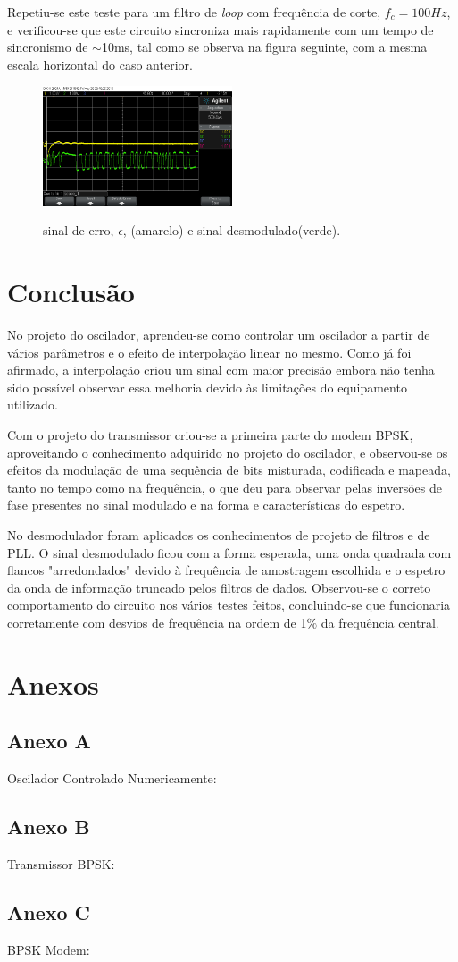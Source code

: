 \documentclass[11pt]{article}
\numberwithin{equation}{section}
\begin{document}
	Repetiu-se este teste para um filtro de \textit{loop} com frequência de corte, $f_c = 100Hz$, e verificou-se que este circuito sincroniza mais rapidamente com um tempo de sincronismo de $\sim$10ms, tal como se observa na figura seguinte, com a mesma escala horizontal do caso anterior.
	
	\begin{figure}[H]
		\centering
		\includegraphics[width=0.5\textwidth]{./transient100Hz}~\\
		\caption{sinal de erro, $\epsilon$, (amarelo) e sinal desmodulado(verde).}
		\label{trans100}
	\end{figure}
	
\section{Conclusão}

No projeto do oscilador, aprendeu-se como controlar um oscilador a partir de vários parâmetros e o efeito de interpolação linear no mesmo. Como já foi afirmado, a interpolação criou um sinal com maior precisão embora não tenha sido possível observar essa melhoria devido às limitações do equipamento utilizado.

Com o projeto do transmissor criou-se a primeira parte do modem BPSK, aproveitando o conhecimento adquirido no projeto do oscilador, e observou-se os efeitos da modulação de uma sequência de bits misturada, codificada e mapeada, tanto no tempo como na frequência, o que deu para observar pelas inversões de fase presentes no sinal modulado e na forma e características do espetro.

No desmodulador foram aplicados os conhecimentos de projeto de filtros e de PLL. O sinal desmodulado ficou com a forma esperada, uma onda quadrada com flancos "arredondados" devido à frequência de amostragem escolhida e o espetro da onda de informação truncado pelos filtros de dados. Observou-se o correto comportamento do circuito nos vários testes feitos, concluindo-se que funcionaria corretamente com desvios de frequência na ordem de 1$\%$ da frequência central.

\section{Anexos}

\subsection{Anexo A}
Oscilador Controlado Numericamente:


\subsection{Anexo B}
Transmissor BPSK:


\subsection{Anexo C}
BPSK Modem:

\end{document}
